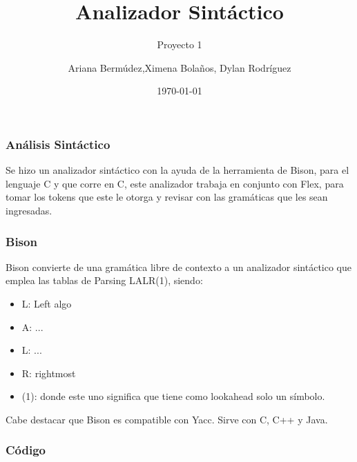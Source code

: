 \documentclass{beamer}
\title{Analizador Sint\'actico}
\subtitle{Proyecto 1}
\author{Ariana Berm\'udez,Ximena Bola\~nos, Dylan Rodr\'iguez}
\institute{Instituto Tecnol\'ogico de Costa Rica}
\date{\today}
\begin{document}
\begin{frame}
 \titlepage 
 \end{frame}\begin{frame}
 \frametitle{An\'alisis Sint\'actico}
  Se hizo un analizador sint\'actico con la ayuda de la herramienta de Bison, para el lenguaje C y que corre en C, este analizador trabaja en conjunto con Flex, para tomar los tokens que este le otorga y revisar con las gram\'aticas que les sean ingresadas. \end{frame}\begin{frame}
 \frametitle{Bison}
 Bison convierte de una gram\'atica libre de contexto a un analizador sint\'actico que emplea las tablas de Parsing LALR(1), siendo: \begin{itemize} \item L: Left algo \item A: ... \item L: ... \item R: rightmost \item (1): donde este uno significa que tiene como lookahead solo un s\'imbolo. \end{itemize} Cabe destacar que Bison es compatible con Yacc. Sirve con C, C++ y Java. \end{frame}\begin{frame}[fragile]
\frametitle{C\'odigo}
\begin{lstlisting}[style=CStyle]


 


\end{lstlisting}
\end{frame}
\end{document}
